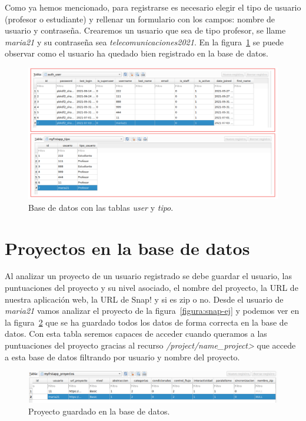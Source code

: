 \documentclass[a4paper, 12pt]{book}
\begin{document}
Como ya hemos mencionado, para registrarse es necesario elegir el tipo de usuario (profesor o estudiante) y rellenar un formulario con los campos: nombre de usuario y contraseña. Crearemos un usuario que sea de tipo profesor, se llame \textit{maria21} y su contraseña sea \textit{telecomunicaciones2021}. En la figura~\ref{figura:validacion-user} se puede observar como el usuario ha quedado bien registrado en la base de datos.
\begin{figure}[h]
            \centering
            \includegraphics[scale=0.37]{img/validacion-user.png}
            \caption{Base de datos con las tablas \textit{user} y \textit{tipo}.}
             \label{figura:validacion-user}
        \end{figure}

\section{Proyectos en la base de datos}

Al analizar un proyecto de un usuario registrado se debe guardar el usuario, las puntuaciones del proyecto y su nivel asociado, el nombre del proyecto, la URL de nuestra aplicación web, la URL de Snap! y si es zip o no. Desde el usuario de \textit{maria21} vamos analizar el proyecto de la figura~\ref{figura:snap-ej} y podemos ver en la figura~\ref{figura:validacion-bbdd} que se ha guardado todos los datos de forma correcta en la base de datos. Con esta tabla seremos capaces de acceder cuando queramos a las puntuaciones del proyecto gracias al recurso \textit{/project/\<name\_project>} que accede a esta base de datos filtrando por usuario y nombre del proyecto.
\begin{figure}[h]
            \centering
            \includegraphics[scale=0.37]{img/maria21.png}
            \caption{Proyecto guardado en la base de datos.}
             \label{figura:validacion-bbdd}
        \end{figure}
        
\end{document}

